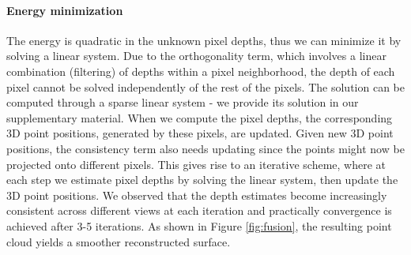 \documentclass[10pt, conference, compsocconf]{IEEEtran}
\begin{document}
\vspace{-1mm}\paragraph{Energy minimization} The  energy is quadratic in the unknown pixel depths, thus we can minimize it by solving a linear system.
Due to the orthogonality term, which involves a linear combination (filtering) of depths within a pixel neighborhood, the depth of each pixel cannot be solved independently of the rest of the pixels. The solution can be computed through a sparse linear system - we provide its solution in our supplementary material. When we compute  the pixel depths, the corresponding 3D point positions, generated by these pixels, are updated. Given new 3D point positions, the consistency term also needs updating since the points might now be projected onto different pixels. This gives rise to an iterative  scheme, where at each step we estimate pixel depths by solving the linear system, then update the 3D point positions. We observed that the depth estimates become increasingly consistent across different views at each iteration and practically  convergence is achieved after 3-5 iterations. 
As shown in Figure \ref{fig:fusion}, the resulting point cloud  yields a  smoother reconstructed surface.
\end{document}
